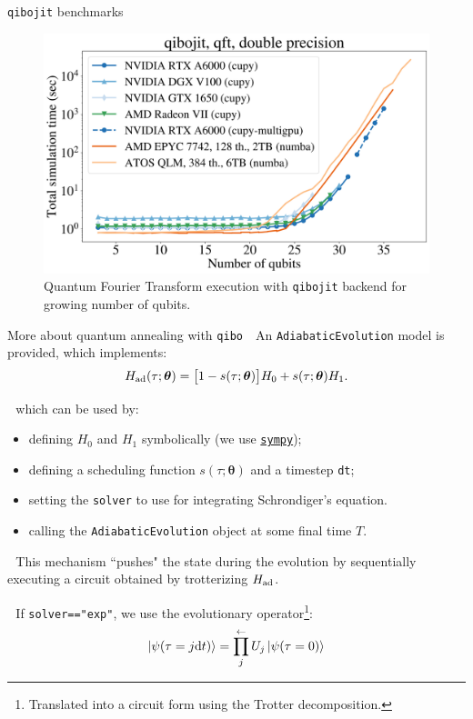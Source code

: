 \documentclass[9pt, xcolor={svgnames}, hyperref={colorlinks, linkcolor=black, citecolor=amethyst, urlcolor=amethyst}]{beamer}
\begin{document}
\begin{frame}{\texttt{qibojit} benchmarks}
\small
   \begin{figure}  
    \includegraphics[width=0.85 \textwidth]{figures/qibojit-qft.png}
    \caption{Quantum Fourier Transform execution with \texttt{qibojit} backend for
    growing number of qubits.}
    \end{figure}
\end{frame}


\begin{frame}{More about quantum annealing with \texttt{qibo}}
\small
\faArrowCircleRight\,\, An \texttt{AdiabaticEvolution} model is provided, which
implements:
\begin{equation}
H_{\rm ad}(\tau; \bm{\theta}) = \bigl[ 1 - s(\tau; \bm{\theta}) \bigr] H_0 +  
s(\tau; \bm{\theta}) H_1.
\end{equation}

\pause
\faArrowCircleRight\,\, which can be used by:

\pause
\begin{itemize}[noitemsep]
\item[\faGamepad] defining $H_0$ and $H_1$ symbolically (we use 
\href{https://docs.sympy.org/latest/index.html}{\texttt{sympy}});    
\pause
\item[\faGamepad] defining a scheduling function $s(\tau; \bm{\theta})$ and a 
timestep \texttt{dt}; 
\pause
\item[\faGamepad] setting the \texttt{solver} to use for integrating Schrondiger's equation.
\pause
\item[\faGamepad] calling the \texttt{AdiabaticEvolution} object at some final time $T$.
\end{itemize}

\pause
\faArrowCircleRight\,\, This mechanism ``pushes" the state during the evolution by
sequentially executing a circuit obtained by trotterizing $H_{\rm ad}$. 

\pause
\faArrowCircleRight\,\, If \texttt{solver=="exp"}, we use the evolutionary 
operator\footnote<8->{Translated into a circuit form using the Trotter decomposition.}:
\begin{equation}
\ket{\psi(\tau = j\text{d}t)} = \prod_{j}^{\leftarrow} U_j \ket{\psi(\tau=0)} 
\end{equation}

\end{frame}
\end{document}
